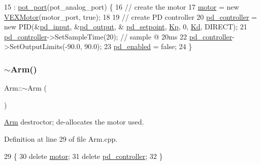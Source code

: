 \begin{DoxyCode}
15                                             : \hyperlink{class_arm_a6e384005fe53340f168ad5708302231a}{pot\_port}(pot\_analog\_port) \{
16     \textcolor{comment}{// create the motor}
17     \hyperlink{class_arm_aa2ef91b2548b256c65dc92166867ba49}{motor} = \textcolor{keyword}{new} \hyperlink{class_v_e_x_motor}{VEXMotor}(motor\_port, \textcolor{keyword}{true});
18 
19     \textcolor{comment}{// create PD controller}
20     \hyperlink{class_arm_a6a6a8ec7d6f383efd1672c1760a32887}{pd\_controller} = \textcolor{keyword}{new} PID(&\hyperlink{class_arm_aa8cb716ce90ab9d02f8e4ab3735904cb}{pd\_input}, &\hyperlink{class_arm_a75af15c369c67a1563f198e029bae1e4}{pd\_output}, &
      \hyperlink{class_arm_a1f4bd75360f1fa61330494569b08f4aa}{pd\_setpoint}, \hyperlink{class_arm_ac220c9bad0a0ee0b068f11b1abf7759a}{Kp}, 0, \hyperlink{class_arm_a5ba9221bf0f78fea4fb2d231551e3bb9}{Kd}, DIRECT);
21     \hyperlink{class_arm_a6a6a8ec7d6f383efd1672c1760a32887}{pd\_controller}->SetSampleTime(20); \textcolor{comment}{// sample @ 20ms}
22     \hyperlink{class_arm_a6a6a8ec7d6f383efd1672c1760a32887}{pd\_controller}->SetOutputLimits(-90.0, 90.0);
23     \hyperlink{class_arm_a44b074fd8db815261bc634f914c1e0f8}{pd\_enabled} = \textcolor{keyword}{false};
24 \}
\end{DoxyCode}
\mbox{\label{class_arm_ae1bcf12831b42e93d431efe3b7910b5e}} 
\subsubsection{\texorpdfstring{$\sim$\+Arm()}{~Arm()}}
{\footnotesize\ttfamily Arm\+::$\sim$\+Arm (\begin{DoxyParamCaption}{ }\end{DoxyParamCaption})}



\hyperlink{class_arm}{Arm} destroctor; de-\/allocates the motor used. 



Definition at line 29 of file Arm.\+cpp.


\begin{DoxyCode}
29           \{
30     \textcolor{keyword}{delete} \hyperlink{class_arm_aa2ef91b2548b256c65dc92166867ba49}{motor};
31     \textcolor{keyword}{delete} \hyperlink{class_arm_a6a6a8ec7d6f383efd1672c1760a32887}{pd\_controller};
32 \}
\end{DoxyCode}


